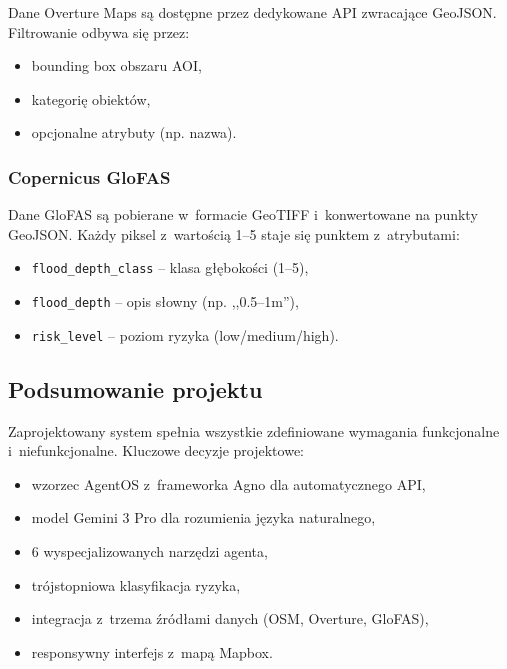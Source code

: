 Dane Overture Maps są dostępne przez dedykowane API zwracające GeoJSON. Filtrowanie odbywa się przez:
\begin{itemize}
    \item bounding box obszaru AOI,
    \item kategorię obiektów,
    \item opcjonalne atrybuty (np. nazwa).
\end{itemize}

\subsubsection{Copernicus GloFAS}

Dane GloFAS są pobierane w~formacie GeoTIFF i~konwertowane na punkty GeoJSON. Każdy piksel z~wartością 1--5 staje się punktem z~atrybutami:
\begin{itemize}
    \item \texttt{flood\_depth\_class} -- klasa głębokości (1--5),
    \item \texttt{flood\_depth} -- opis słowny (np. ,,0.5--1m''),
    \item \texttt{risk\_level} -- poziom ryzyka (low/medium/high).
\end{itemize}

\subsection{Podsumowanie projektu}

Zaprojektowany system spełnia wszystkie zdefiniowane wymagania funkcjonalne i~niefunkcjonalne. Kluczowe decyzje projektowe:
\begin{itemize}
    \item wzorzec AgentOS z~frameworka Agno dla automatycznego API,
    \item model Gemini 3 Pro dla rozumienia języka naturalnego,
    \item 6 wyspecjalizowanych narzędzi agenta,
    \item trójstopniowa klasyfikacja ryzyka,
    \item integracja z~trzema źródłami danych (OSM, Overture, GloFAS),
    \item responsywny interfejs z~mapą Mapbox.
\end{itemize}


